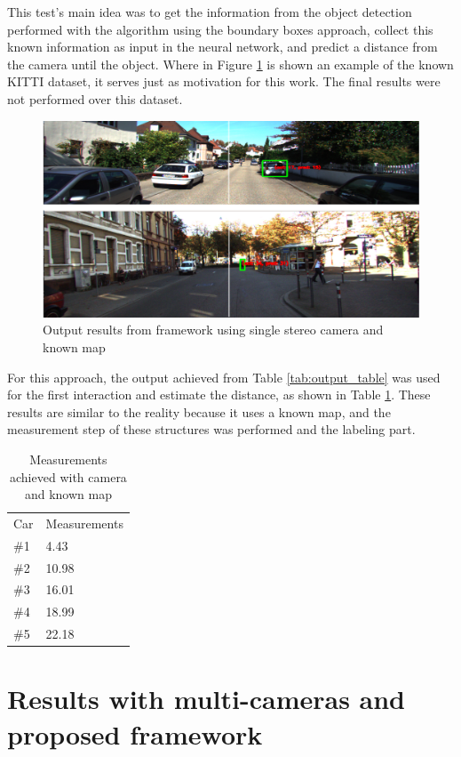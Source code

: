 This test's main idea was to get the information from the object detection performed with the algorithm using the boundary boxes approach, collect this known information as input in the neural network, and predict a distance from the camera until the object. Where in Figure \ref{fig:output} is shown an example of the known KITTI dataset, it serves just as motivation for this work. The final results were not performed over this dataset. 

\begin{figure}[H]
\centering
\includegraphics[width=\textwidth]{imagens/ouput.png}
\caption{Output results from framework using single stereo camera and known map}
\label{fig:output}
\end{figure}

For this approach, the output achieved from Table \ref{tab:output_table} was used for the first interaction and estimate the distance, as shown in Table \ref{tab:output_2}. These results are similar to the reality because it uses a known map, and the measurement step of these structures was performed and the labeling part.

\begin{table}[H]
\centering
\caption{Measurements achieved with camera and known map}
\begin{tabular}{l|l} 
\toprule
Car &  Measurements      \\
\#1   & 4.43        \\
\#2   & 10.98       \\
\#3   & 16.01       \\
\#4   & 18.99       \\
\#5   & 22.18       \\
\bottomrule
\end{tabular}
\label{tab:output_2}
\end{table} 


\section{Results with multi-cameras and proposed framework}


